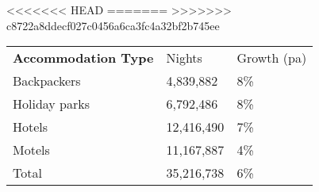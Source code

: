 <<<<<<< HEAD
=======
>>>>>>> c8722a8ddecf027c0456a6ca3fc4a32bf2b745ee
\begin{tabular}[t]{p{4.8cm}>{\hfill}p{1.3cm}>{\hfill}p{1.4cm}}
 \textbf{Accommodation Type} & Nights & Growth (pa) \\ 
 Backpackers &  4,839,882 & 8\% \\ 
  Holiday parks &  6,792,486 & 8\% \\ 
  Hotels & 12,416,490 & 7\% \\ 
  Motels & 11,167,887 & 4\% \\ 
  Total & 35,216,738 & 6\% \\ 
  \end{tabular}

